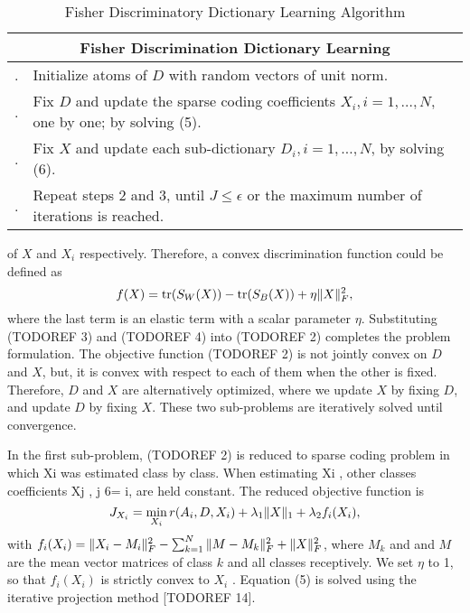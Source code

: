 \documentclass[conference]{IEEEtran}
\begin{document}
	
	\begin{table}
		\caption{Fisher Discriminatory Dictionary Learning Algorithm}
		\label{tab:fisher_disc}
		\begin{tabularx}{\columnwidth}{p{0.01cm} p{}}
			\hline
			\multicolumn{2}{c}{\textbf{Fisher Discrimination Dictionary Learning}} \\
			\hline
			\stepcounter{szaml}\theszaml\stepcounter{szaml}. & Initialize atoms of $D$ with random vectors of unit norm. \\
			\theszaml\stepcounter{szaml}. & Fix $D$ and update the sparse coding coefficients $X_i, i = 1, \dots, N$, one by one; by solving (5). \\
			\theszaml\stepcounter{szaml}. & Fix $X$ and update each sub-dictionary $D_i, i = 1, \dots , N$, by solving (6). \\
			\theszaml\stepcounter{szaml}. & Repeat steps 2 and 3, until $J \leq \epsilon$ or the maximum number of iterations is reached. \\
			\hline
		\end{tabularx}
	\end{table}
	
	of $X$ and $X_i$ respectively. Therefore, a convex discrimination
	function could be defined as
	\begin{equation}
		f(X)=\mathrm{tr}(S_W(X))-\mathrm{tr}(S_B(X))+\eta\Vert{X}\Vert_F^2,
	\end{equation}
	where the last term is an elastic term with a scalar parameter $\eta$. Substituting (TODOREF 3) and (TODOREF 4) into (TODOREF 2) completes the problem formulation. The objective function (TODOREF 2) is not jointly convex on $D$ and $X$, but, it is convex with respect to each of them when the other is fixed. Therefore, $D$ and $X$ are alternatively optimized, where we update $X$ by fixing $D$, and update $D$ by fixing $X$. These two sub-problems are iteratively solved until convergence.
	
	In the first sub-problem, (TODOREF 2) is reduced to sparse coding problem in which Xi was estimated class by class. When estimating Xi , other classes coefficients Xj , j 6= i, are held constant. The reduced objective function is
	\begin{equation}
		J_{X_i}=\min_{X_i}r(A_i,D,X_i)+\lambda_1\Vert{X}\Vert_1+\lambda_2f_i(X_i),
	\end{equation}
	with $f_i(X_i)=\Vert{X_i-M_i}\Vert_F^2-\sum_{k=1}^{N}\Vert{M-M_k}\Vert_F^2+\Vert{X}\Vert_F^2$, where $M_k$ and and $M$ are the mean vector matrices of class $k$ and all classes receptively. We set $\eta$ to 1, so that $f_i(X_i)$ is strictly convex to $X_i$ . Equation (5) is solved using the iterative projection method [TODOREF 14].
	
\end{document}
